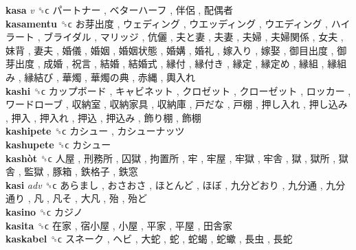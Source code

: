 \textbf{kasa} \emph{v}  ␝ϲ   パートナー ,  ベターハーフ ,  伴侶 ,  配偶者   \\
\textbf{kasamentu} ␝ϲ   お芽出度 ,  ウェディング ,  ウエッディング ,  ウエディング ,  ハイラート ,  ブライダル ,  マリッジ ,  伉儷 ,  夫と妻 ,  夫妻 ,  夫婦 ,  夫婦関係 ,  女夫 ,  妹背 ,  妻夫 ,  婚儀 ,  婚姻 ,  婚姻状態 ,  婚媾 ,  婚礼 ,  嫁入り ,  嫁娶 ,  御目出度 ,  御芽出度 ,  成婚 ,  祝言 ,  結婚 ,  結婚式 ,  縁付 ,  縁付き ,  縁定 ,  縁定め ,  縁組 ,  縁組み ,  縁結び ,  華燭 ,  華燭の典 ,  赤縄 ,  輿入れ   \\
\textbf{kashi} ␝ϲ   カップボード ,  キャビネット ,  クロゼット ,  クローゼット ,  ロッカー ,  ワードローブ ,  収納室 ,  収納家具 ,  収納庫 ,  戸だな ,  戸棚 ,  押し入れ ,  押し込み ,  押入 ,  押入れ ,  押込 ,  押込み ,  飾り棚 ,  飾棚   \\
\textbf{kashipete} ␝ϲ   カシュー ,  カシューナッツ   \\
\textbf{kashupete} ␝ϲ   カシュー   \\
\textbf{kashòt} ␝ϲ   人屋 ,  刑務所 ,  囚獄 ,  拘置所 ,  牢 ,  牢屋 ,  牢獄 ,  牢舎 ,  獄 ,  獄所 ,  獄舎 ,  監獄 ,  豚箱 ,  鉄格子 ,  鉄窓   \\
\textbf{kasi} \emph{adv}  ␝ϲ   あらまし ,  おさおさ ,  ほとんど ,  ほぼ ,  九分どおり ,  九分通 ,  九分通り ,  凡 ,  凡そ ,  大凡 ,  殆 ,  殆ど   \\
\textbf{kasino} ␝ϲ   カジノ   \\
\textbf{kasita} ␝ϲ   在家 ,  宿小屋 ,  小屋 ,  平家 ,  平屋 ,  田舎家   \\
\textbf{kaskabel} ␝ϲ   スネーク ,  ヘビ ,  大蛇 ,  蛇 ,  蛇蝎 ,  蛇蠍 ,  長虫 ,  長蛇   \\
